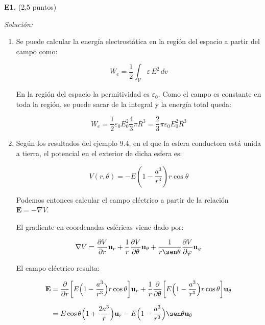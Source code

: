 \textbf{E1.} (2,5 puntos)

\vspace{20px}
\textit{Solución:}
\\

\begin{enumerate}
[label=\alph*)]
    \item Se puede calcular la energía electrostática en la región del espacio a partir del campo como:

    \begin{equation*}
        W_e = \frac{1}{2} \int_{\mathcal V} \varepsilon \, E^2 \, dv
    \end{equation*}

    En la región del espacio la permitividad es $\varepsilon_0$. Como el campo es constante en toda la región, se puede sacar de la integral y
    la energía total queda:

    \begin{equation*}
        W_e = \frac{1}{2} \varepsilon_0 E_0^2   \frac{4}{3}   \pi    R^3 =  \frac{2}{3}  \pi  \varepsilon_0 E_0^2 R^3
    \end{equation*}

    \vspace{20px}

    \item Según los resultados del ejemplo 9.4, en el que la esfera conductora está unida a tierra, el potencial en el exterior de dicha esfera es:

    \begin{equation*}
        V(r, \theta) = - E ( 1 - \frac{a^3}{r^3})  r  \cos\theta
    \end{equation*}

    Podemos entonces calcular el campo eléctrico a partir de la relación $\textbf{E} = - \nabla V$.

    El gradiente en coordenadas esféricas viene dado por:

    \begin{equation*}
        \nabla V = \frac{\partial V}{\partial r} \textbf{u}_r +
        \frac{1}{r}\frac{\partial V}{\partial \theta} \textbf{u}_\theta +
        \frac{1}{r \sen\theta}\frac{\partial V}{\partial \varphi} \textbf{u}_{\varphi}
    \end{equation*}

    El campo eléctrico resulta:

    \begin{align*}
        \textbf{E} & = \frac{\partial}{\partial r} \biggl[E \Bigl(1 - \frac{a^3}{r^3} \Bigr) r \cos\theta \biggr] \textbf{u}_r +
        \frac{1}{r}\frac{\partial}{\partial \theta} \biggl[E \Bigl(1 - \frac{a^3}{r^3} \Bigr) r \cos\theta \biggr] \textbf{u}_{\theta} \\[6px]
        & = E \cos\theta \Bigl(1 + \frac{2a^3}{r} \Bigr) \textbf{u}_r -
        E \Bigl(1 - \frac{a^3}{r^3} \Bigr) \sen\theta \textbf{u}_{\theta}
    \end{align*}


\end{enumerate}
